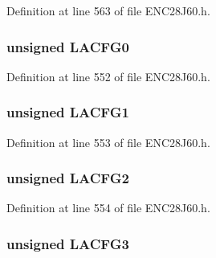 Definition at line 563 of file E\+N\+C28\+J60.\+h.

\hypertarget{union_p_h_y_r_e_g_a988a13197983d115d2ff6f3ae86c8033}{}
\subsubsection[{L\+A\+C\+F\+G0}]{\setlength{\rightskip}{0pt plus 5cm}unsigned L\+A\+C\+F\+G0}\label{union_p_h_y_r_e_g_a988a13197983d115d2ff6f3ae86c8033}


Definition at line 552 of file E\+N\+C28\+J60.\+h.

\hypertarget{union_p_h_y_r_e_g_abd77ce3c7bc320fb2a955cdf66983d6c}{}
\subsubsection[{L\+A\+C\+F\+G1}]{\setlength{\rightskip}{0pt plus 5cm}unsigned L\+A\+C\+F\+G1}\label{union_p_h_y_r_e_g_abd77ce3c7bc320fb2a955cdf66983d6c}


Definition at line 553 of file E\+N\+C28\+J60.\+h.

\hypertarget{union_p_h_y_r_e_g_a767637f917eccfab37302fc7f186ae43}{}
\subsubsection[{L\+A\+C\+F\+G2}]{\setlength{\rightskip}{0pt plus 5cm}unsigned L\+A\+C\+F\+G2}\label{union_p_h_y_r_e_g_a767637f917eccfab37302fc7f186ae43}


Definition at line 554 of file E\+N\+C28\+J60.\+h.

\hypertarget{union_p_h_y_r_e_g_a4283966440df06790bd8eda11f83e4ae}{}
\subsubsection[{L\+A\+C\+F\+G3}]{\setlength{\rightskip}{0pt plus 5cm}unsigned L\+A\+C\+F\+G3}\label{union_p_h_y_r_e_g_a4283966440df06790bd8eda11f83e4ae}


